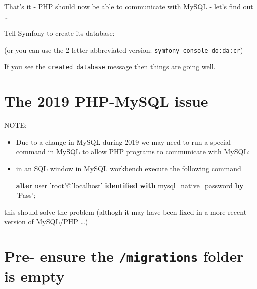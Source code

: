 \documentclass[a4paperpaper,openright]{book}
\newenvironment{Shaded}{}{}
\newcommand{\ExtensionTok}[1]{#1}
\newcommand{\FunctionTok}[1]{\textcolor[rgb]{0.02,0.16,0.49}{#1}}
\newcommand{\KeywordTok}[1]{\textcolor[rgb]{0.00,0.44,0.13}{\textbf{#1}}}
\newcommand{\NormalTok}[1]{#1}
\newcommand{\StringTok}[1]{\textcolor[rgb]{0.25,0.44,0.63}{#1}}
\begin{document}
That's it - PHP should now be able to communicate with MySQL - let's
find out \ldots{}

Tell Symfony to create its database:

\begin{Shaded}
\end{Shaded}

(or you can use the 2-letter abbreviated version:
\texttt{symfony\ console\ do:da:cr})

If you see the \texttt{created\ database} message then things are going
well.

\hypertarget{the-2019-php-mysql-issue}{%
\section{The 2019 PHP-MySQL issue}\label{the-2019-php-mysql-issue}}

NOTE:

\begin{itemize}
\item
  Due to a change in MySQL during 2019 we may need to run a special
  command in MySQL to allow PHP programs to communicate with MySQL:
\item
  in an SQL window in MySQL workbench execute the following command

\begin{Shaded}
\begin{Highlighting}[]
  \KeywordTok{alter} \FunctionTok{user} \StringTok{'root'}\NormalTok{@}\StringTok{'localhost'} \KeywordTok{identified} \KeywordTok{with}\NormalTok{ mysql_native_password }\KeywordTok{by} \StringTok{'Pass$$'}\NormalTok{;}
\end{Highlighting}
\end{Shaded}
\end{itemize}

this should solve the problem (althogh it may have been fixed in a more
recent version of MySQL/PHP \ldots{})

\hypertarget{pre--ensure-the-migrations-folder-is-empty}{%
\section{\texorpdfstring{Pre- ensure the \texttt{/migrations} folder is
empty}{Pre- ensure the /migrations folder is empty}}\label{pre--ensure-the-migrations-folder-is-empty}}
\end{document}
